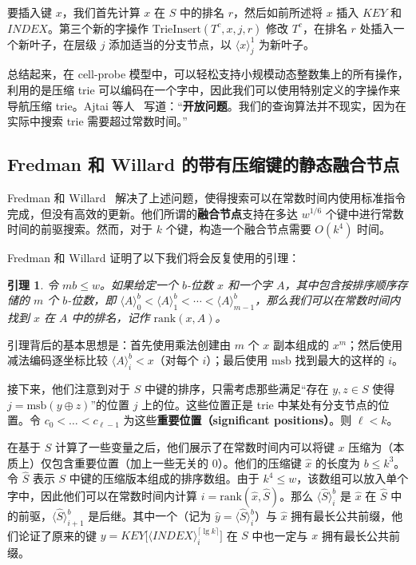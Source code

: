 \documentclass[11pt,a4paper]{ctexart}
\newcommand{\tto}{\text{0}}
\newcommand{\lpiece}[3]{\langle #1 \rangle_{#2}^{#3}}
\newcommand{\XOR}{\oplus}
\newcommand{\MSB}{\text{msb}}
\newcommand{\RANK}{\text{rank}}
\newcommand{\ceiling}[1]{\lceil #1 \rceil}
\newtheorem{lemma}{引理}[section]
\begin{document}
要插入键 $x$，我们首先计算 $x$ 在 $S$ 中的排名 $r$，然后如前所述将 $x$ 插入 $KEY$ 和 $INDEX$。第三个新的字操作 $\text{TrieInsert}(T^c, x, j, r)$ 修改 $T^c$，在排名 $r$ 处插入一个新叶子，在层级 $j$ 添加适当的分支节点，以 $\lpiece{x}{j}{1}$ 为新叶子。

总结起来，在 cell-probe 模型中，可以轻松支持小规模动态整数集上的所有操作，利用的是压缩 trie 可以编码在一个字中，因此我们可以使用特别定义的字操作来导航压缩 trie。Ajtai 等人~\cite{ajtai84hashing} 写道：``\textbf{开放问题}。我们的查询算法并不现实，因为在实际中搜索 trie 需要超过常数时间。''

\subsection{Fredman 和 Willard 的带有压缩键的静态融合节点}

Fredman 和 Willard~\cite{fredman93fusion} 解决了上述问题，使得搜索可以在常数时间内使用标准指令完成，但没有高效的更新。他们所谓的\textbf{融合节点}支持在多达 $w^{1/6}$ 个键中进行常数时间的前驱搜索。然而，对于 $k$ 个键，构造一个融合节点需要 $O(k^4)$ 时间。

Fredman 和 Willard 证明了以下我们将会反复使用的引理：
\begin{lemma}\label{lem:rank}
令 $mb \leq w$。如果给定一个 $b$-位数 $x$ 和一个字 $A$，其中包含按排序顺序存储的 $m$ 个 $b$-位数，即 $\lpiece{A}{0}{b} < \lpiece{A}{1}{b} < \cdots < \lpiece{A}{m-1}{b}$，那么我们可以在常数时间内找到 $x$ 在 $A$ 中的排名，记作 $\RANK(x, A)$。
\end{lemma}

引理背后的基本思想是：首先使用乘法创建由 $m$ 个 $x$ 副本组成的 $x^m$；然后使用减法编码逐坐标比较 $\lpiece{A}{i}{b} < x$（对每个 $i$）；最后使用 $\MSB$ 找到最大的这样的 $i$。

接下来，他们注意到对于 $S$ 中键的排序，只需考虑那些满足``存在 $y, z \in S$ 使得 $j = \MSB(y \XOR z)$''的位置 $j$ 上的位。这些位置正是 trie 中某处有分支节点的位置。令 $c_0 < \dots < c_{\ell-1}$ 为这些\textbf{重要位置（significant positions）}。则 $\ell < k$。

在基于 $S$ 计算了一些变量之后，他们展示了在常数时间内可以将键 $x$ 压缩为（本质上）仅包含重要位置（加上一些无关的 $\tto$）。他们的压缩键 $\hat{x}$ 的长度为 $b \leq k^3$。令 $\hat{S}$ 表示 $S$ 中键的压缩版本组成的排序数组。由于 $k^4 \leq w$，该数组可以放入单个字中，因此他们可以在常数时间内计算 $i = \RANK(\hat{x}, \hat{S})$。那么 $\lpiece{\hat{S}}{i}{b}$ 是 $\hat{x}$ 在 $\hat{S}$ 中的前驱，$\lpiece{\hat{S}}{i+1}{b}$ 是后继。其中一个（记为 $\hat{y} = \lpiece{\hat{S}}{i}{b}$）与 $\hat{x}$ 拥有最长公共前缀，他们论证了原来的键 $y = KEY\bigl[\lpiece{INDEX}{i}{\ceiling{\lg k}}\bigr]$ 在 $S$ 中也一定与 $x$ 拥有最长公共前缀。
\end{document}
